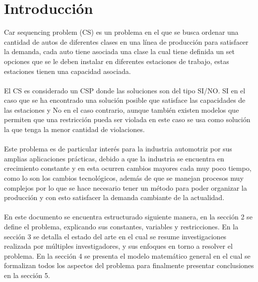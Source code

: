 \documentclass[letter, 10pt]{article}
\begin{document}
\section{Introducci\'on}
Car sequencing problem (CS) es un problema en el que se busca ordenar una cantidad de autos de diferentes clases en una l\'inea de producci\'on para satisfacer la demanda, cada auto tiene asociada una clase la cual tiene definida un set opciones que se le deben instalar en diferentes estaciones de trabajo, estas estaciones tienen una capacidad asociada.\\\\
El CS es considerado un CSP donde las soluciones son del tipo SI/NO. SI en el caso que se ha encontrado una soluci\'on posible que satisface las capacidades de las estaciones y No en el caso contrario, aunque tambi\'en existen modelos que permiten que una restricci\'on pueda ser violada en este caso se usa como soluci\'on la que tenga la menor cantidad de violaciones.
\\\\
Este problema es de particular inter\'es para la industria automotriz por sus amplias aplicaciones pr\'acticas, debido a que la industria se encuentra en crecimiento constante y en esta ocurren cambios mayores cada muy poco tiempo, como lo son los cambios tecnol\'ogicos, adem\'as de que se manejan procesos muy complejos por lo que se hace necesario tener un m\'etodo para poder organizar la producci\'on y con esto satisfacer la demanda cambiante de la actualidad. 
\\\\
En este documento se encuentra estructurado siguiente manera, en la secci\'on 2 se define el problema, explicando sus constantes, variables y restricciones. En la secci\'on 3 se detalla el estado del arte en el cual se resume investigaciones realizada por m\'ultiples investigadores, y sus enfoques en torno a resolver el problema. En la secci\'on 4 se presenta el modelo matem\'atico general en el cual se formalizan todos los aspectos del problema para finalmente presentar conclusiones en la secci\'on 5. 
\end{document}
